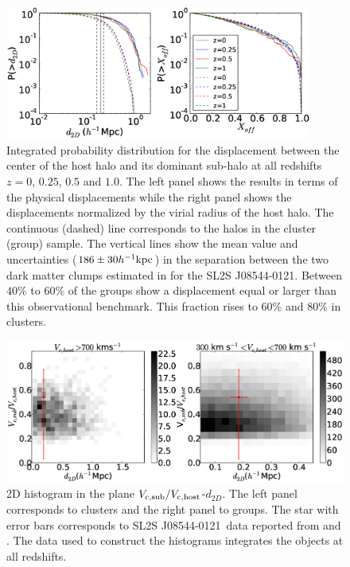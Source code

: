\documentclass{emulateapj}
\newcommand{\hkpc}{{\ifmmode{h^{-1}{\rm kpc}}\else{$h^{-1}$kpc }\fi}}
\newcommand{\bullg}{SL2S J08544-0121}
\begin{document}
\begin{figure}
\begin{center}
\includegraphics[width=0.9\textwidth]{figure_1.eps}
\end{center}
\caption{
  Integrated probability distribution for the displacement between the
  center of the host halo and its dominant sub-halo at all redshifts
  $z=0$, $0.25$, $0.5$ and $1.0$. The left panel
  shows the results in terms of the physical displacements while the
  right panel shows the displacements normalized by the virial radius
  of the host halo. The continuous (dashed) line corresponds to the halos in the
  cluster (group) sample.
  The vertical lines show the mean value and uncertainties ($186\pm
  30\hkpc$) in the  separation between the two dark matter clumps
  estimated in \citet{Gastaldello} for the \bullg. Between $40\%$
  to $60\%$ of the groups show a displacement equal or larger than
  this observational benchmark. This fraction rises to $60\%$ and
  $80\%$ in clusters.}
\label{fig:displacement}
\end{figure}

\begin{figure}
\begin{center}
\includegraphics[width=1.0\textwidth]{figure_2.eps} 
\end{center}
\caption{2D histogram in the plane $V_{\rm c,sub}/V_{\rm
    c,host}$-$d_{2D}$. The left panel corresponds to clusters and the
  right panel to groups. The star with error bars corresponds to
  \bullg\ data reported from \citet{2013A&A...552A..80M} and
  \citet{Gastaldello}. The data used to construct the histograms
  integrates the objects at all redshifts. }
\label{fig:mass_displacement}
\end{figure}
\end{document}
